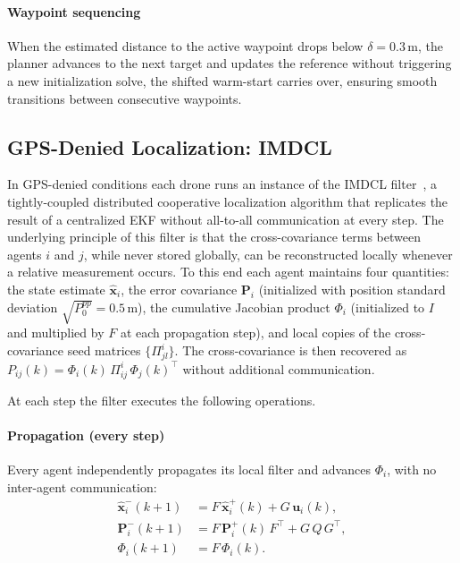 \documentclass[journal,10pt,twocolumn]{IEEEtran}
\begin{document}
\paragraph{Waypoint sequencing}
When the estimated distance to the active waypoint drops below
$\delta = 0.3$\,m, the planner advances to the next target and updates
the reference without triggering a new initialization solve, the
shifted warm-start carries over, ensuring smooth transitions between
consecutive waypoints.

\subsection{GPS-Denied Localization: IMDCL}
\label{sec:imdcl}

In GPS-denied conditions each drone runs an instance of the IMDCL
filter~\cite{Kia2016}, a tightly-coupled distributed cooperative
localization algorithm that replicates the result of a centralized EKF
without all-to-all communication at every step.
The underlying principle of this filter is that the cross-covariance terms between agents $i$
and $j$, while never stored globally, can be reconstructed locally
whenever a relative measurement occurs.  To this end each agent
maintains four quantities: the state estimate $\hat{\mathbf{x}}_i$,
the error covariance $\mathbf{P}_i$ (initialized with position standard
deviation $\sqrt{P^{pp}_0} = 0.5$\,m), the cumulative Jacobian product
$\Phi_i$ (initialized to $I$ and multiplied by $F$ at each propagation
step), and local copies of the cross-covariance seed matrices
$\{\Pi^i_{jl}\}$.  The cross-covariance is then recovered as
$P_{ij}(k) = \Phi_i(k)\,\Pi^i_{ij}\,\Phi_j(k)^\top$ without additional
communication.

At each step the filter executes the following operations.

\paragraph{Propagation (every step)}
Every agent independently propagates its local filter and advances
$\Phi_i$, with no inter-agent communication:
\begin{align}
  \hat{\mathbf{x}}^-_i(k{+}1) &= F\,\hat{\mathbf{x}}^+_i(k) +
  G\,\mathbf{u}_i(k), \\
  \mathbf{P}^-_i(k{+}1) &= F\,\mathbf{P}^+_i(k)\,F^\top +
  G\,Q\,G^\top, \\
  \Phi_i(k{+}1) &= F\,\Phi_i(k).
  \label{eq:imdcl_prop}
\end{align}
\end{document}
